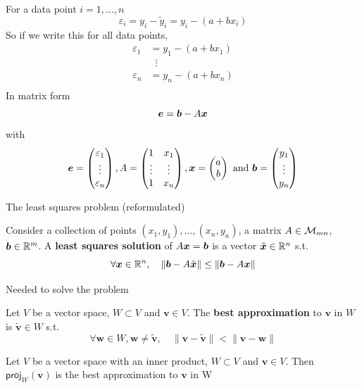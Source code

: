 \documentclass[aspectratio=169]{beamer}\usepackage[]{graphicx}\usepackage[]{xcolor}
\begin{document}
\begin{frame}
	For a data point $i=1,\ldots,n$
	\[
	\varepsilon_i = y_i-\tilde y_i = y_i - (a+bx_i)
	\]
	So if we write this for all data points,
	\begin{align*}
	\varepsilon_1 &= y_1 - (a+bx_1) \\
	&\;\;\vdots \\
	\varepsilon_n &= y_n - (a+bx_n) \\
	\end{align*}
	In matrix form
	\[
	\bm{e} = \bm{b}-A\bm{x}
	\]
	with
	\[
	\bm{e} = \begin{pmatrix}
	\varepsilon_1\\ \vdots\\ \varepsilon_n
	\end{pmatrix},
	A=\begin{pmatrix}
	1 & x_1 \\ \vdots & \vdots \\ 1 & x_n
	\end{pmatrix},
	\bm{x} = \begin{pmatrix}
	a\\b
	\end{pmatrix}\textrm{ and }
	\bm{b} = \begin{pmatrix}
	y_1\\ \vdots\\ y_n
	\end{pmatrix}
	\]
\end{frame}

\begin{frame}{The least squares problem (reformulated)}
\begin{definition}
Consider a collection of points $(x_1,y_1),\ldots,(x_n,y_n)$, a matrix $A\in\mathcal{M}_{mn}$, $\bm{b}\in\mathbb{R}^m$. A \textbf{least squares solution} of $A\bm{x}=\bm{b}$ is a vector $\tilde {\bm{x}}\in\mathbb{R}^n$ s.t.
\[
\forall \bm{x}\in\mathbb{R}^n,\quad \|\bm{b}-A\tilde{\bm{x}}\|\leq \|\bm{b}-A\bm{x}\|
\]
\end{definition}
\end{frame}


\begin{frame}{Needed to solve the problem}
\begin{definition}
Let $V$ be a vector space, $W\subset V$ and $\mathbf{v}\in V$. The \textbf{best approximation} to $\mathbf{v}$ in $W$ is $\tilde{\mathbf{v}}\in W$ s.t.
\[
\forall\mathbf{w}\in W, \mathbf{w}\neq\tilde{\mathbf{v}}, \quad
\|\mathbf{v}-\tilde{\mathbf{v}}\| < \|\mathbf{v}-\mathbf{w}\|
\]
\end{definition}
\vfill
\begin{theorem}
Let $V$ be a vector space with an inner product, $W\subset V$ and $\mathbf{v}\in V$. Then $\mathsf{proj}_W(\mathbf{v})$ is the best approximation to $\mathbf{v}$ in W
\end{theorem}
\end{frame}
\end{document}
